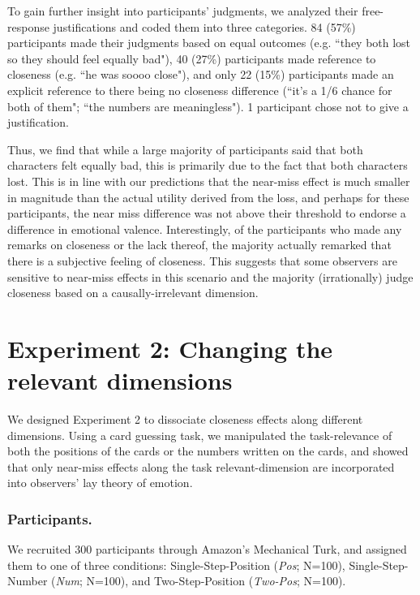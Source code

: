 \documentclass[10pt,letterpaper]{article}
\begin{document}
To gain further insight into participants' judgments, we analyzed their free-response justifications and coded them into three categories. 84 (57\%) participants made their judgments based on equal outcomes (e.g. ``they both lost so they should feel equally bad"), 40 (27\%) participants made reference to closeness (e.g. ``he was soooo close"), and only 22 (15\%) participants made an explicit reference to there being no closeness difference (``it's a 1/6 chance for both of them"; ``the numbers are meaningless"). 1 participant chose not to give a justification. 


Thus, we find that while a large majority of participants said that both characters felt equally bad, this is primarily due to the fact that both characters lost. This is in line with our predictions that the near-miss effect is much smaller in magnitude than the actual utility derived from the loss, and perhaps for these participants, the near miss difference was not above their threshold to endorse a difference in emotional valence. Interestingly, of the participants who made any remarks on closeness or the lack thereof, the majority actually remarked that there is a subjective feeling of closeness. This suggests that some observers are sensitive to near-miss effects in this scenario and the majority (irrationally) judge closeness based on a causally-irrelevant dimension.







\section{Experiment 2: Changing the relevant dimensions}

We designed Experiment 2 to dissociate closeness effects along different dimensions. Using a card guessing task, we manipulated the task-relevance of both the positions of the cards or the numbers written on the cards, and showed that only near-miss effects along the task relevant-dimension are incorporated into observers' lay theory of emotion.

\subsubsection{Participants.} We recruited 300 participants through Amazon's Mechanical Turk, and assigned them to one of three conditions: Single-Step-Position (\textit{Pos}; N=100), Single-Step-Number (\textit{Num}; N=100), and Two-Step-Position (\textit{Two-Pos}; N=100).
\end{document}

